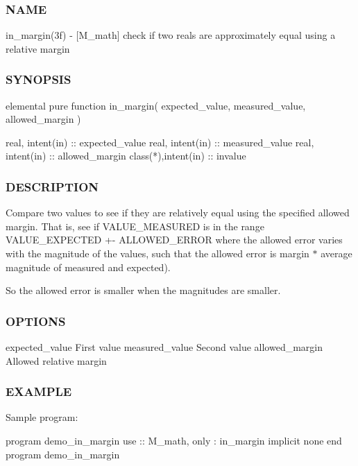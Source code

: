\subsubsection*{N\+A\+ME}

in\+\_\+margin(3f) -\/ \mbox{[}M\+\_\+math\mbox{]} check if two reals are approximately equal using a relative margin 

\subsubsection*{S\+Y\+N\+O\+P\+S\+IS}

\begin{DoxyVerb} elemental pure function in_margin( expected_value, measured_value, allowed_margin )

  real, intent(in)    :: expected_value
  real, intent(in)    :: measured_value
  real, intent(in)    :: allowed_margin
  class(*),intent(in) :: invalue
\end{DoxyVerb}


\subsubsection*{D\+E\+S\+C\+R\+I\+P\+T\+I\+ON}

Compare two values to see if they are relatively equal using the specified allowed margin. That is, see if V\+A\+L\+U\+E\+\_\+\+M\+E\+A\+S\+U\+R\+ED is in the range V\+A\+L\+U\+E\+\_\+\+E\+X\+P\+E\+C\+T\+ED +-\/ A\+L\+L\+O\+W\+E\+D\+\_\+\+E\+R\+R\+OR where the allowed error varies with the magnitude of the values, such that the allowed error is margin $\ast$ average magnitude of measured and expected).

So the allowed error is smaller when the magnitudes are smaller.

\subsubsection*{O\+P\+T\+I\+O\+NS}

expected\+\_\+value First value measured\+\_\+value Second value allowed\+\_\+margin Allowed relative margin

\subsubsection*{E\+X\+A\+M\+P\+LE}

Sample program\+:

program demo\+\_\+in\+\_\+margin use \+:\+: M\+\_\+math, only \+: in\+\_\+margin implicit none end program demo\+\_\+in\+\_\+margin 

